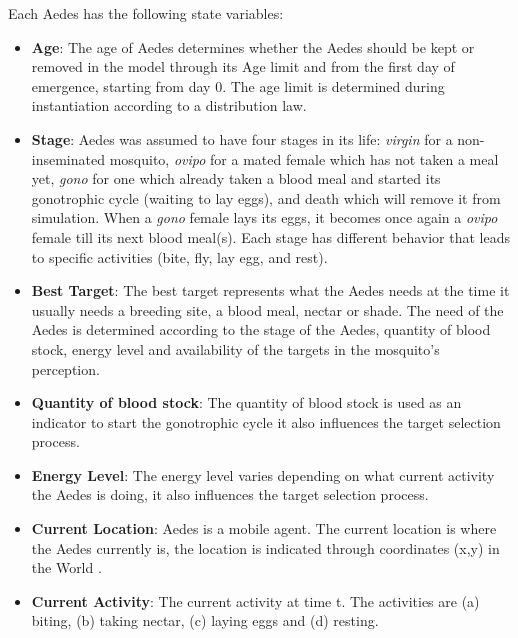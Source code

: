 Each Aedes has the following state variables:

\begin{itemize}
    \item \textbf{Age}: The age of Aedes determines whether the Aedes should be kept or removed in the model through its Age limit and from the first day of emergence, starting from day 0. The age limit is determined during instantiation according to a distribution law.
    \item \textbf{Stage}: Aedes was assumed to have four stages in its life: \textit{virgin} for a non-inseminated mosquito, \textit{ovipo} for a mated female which has not taken a meal yet, \textit{gono} for one which already taken a blood meal and started its gonotrophic cycle (waiting to lay eggs), and death which will remove it from simulation. When a \textit{gono} female lays its eggs, it becomes once again a \textit{ovipo} female till its next blood meal(s). Each stage has different behavior that leads to specific activities (bite, fly, lay egg, and rest).
    \item \textbf{Best Target}: The best target represents what the Aedes needs at the time it usually needs a breeding site, a blood meal, nectar or shade. The need of the Aedes is determined according to the stage of the Aedes, quantity of blood stock, energy level and availability of the targets in the mosquito's perception. 
    \item \textbf{Quantity of blood stock}: The quantity of blood stock is used as an indicator to start the gonotrophic cycle it also influences the target selection process.
    \item \textbf{Energy Level}: The energy level varies depending on what current activity the Aedes is doing, it also influences the target selection process.
    \item \textbf{Current Location}: Aedes is a mobile agent. The current location is where the Aedes currently is, the location is indicated through coordinates (x,y) in the World .
    \item \textbf{Current Activity}: The current activity at time t. The activities are (a) biting, (b) taking nectar, (c) laying eggs and (d) resting.
\end{itemize}

